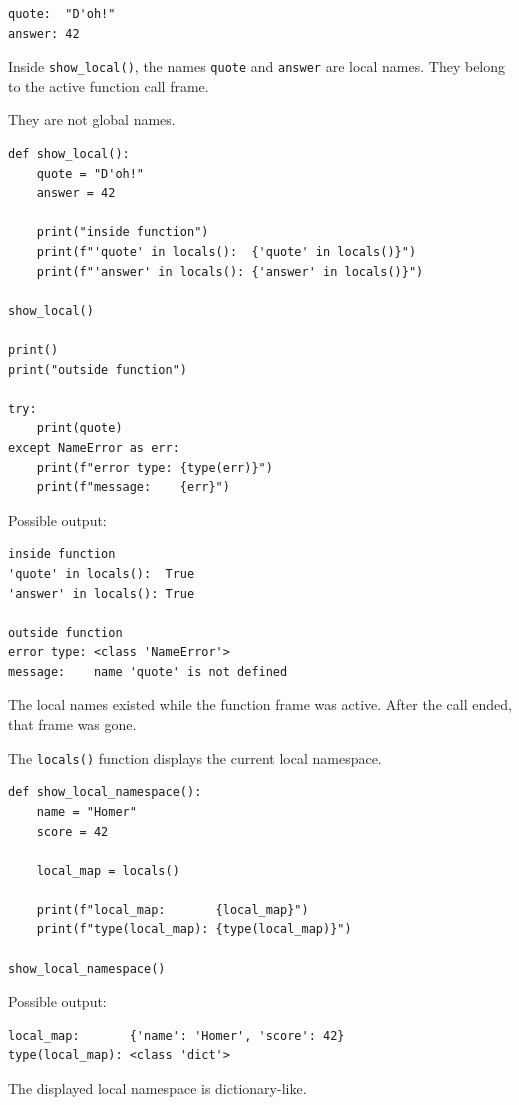 \begin{verbatim}
quote:  "D'oh!"
answer: 42
\end{verbatim}

Inside \texttt{show\_local()}, the names \texttt{quote} and \texttt{answer} are local names. They belong to the active function call frame.

They are not global names.

\begin{verbatim}
def show_local():
    quote = "D'oh!"
    answer = 42

    print("inside function")
    print(f"'quote' in locals():  {'quote' in locals()}")
    print(f"'answer' in locals(): {'answer' in locals()}")

show_local()

print()
print("outside function")

try:
    print(quote)
except NameError as err:
    print(f"error type: {type(err)}")
    print(f"message:    {err}")
\end{verbatim}

Possible output:

\begin{verbatim}
inside function
'quote' in locals():  True
'answer' in locals(): True

outside function
error type: <class 'NameError'>
message:    name 'quote' is not defined
\end{verbatim}

The local names existed while the function frame was active. After the call ended, that frame was gone.

The \texttt{locals()} function displays the current local namespace.

\begin{verbatim}
def show_local_namespace():
    name = "Homer"
    score = 42

    local_map = locals()

    print(f"local_map:       {local_map}")
    print(f"type(local_map): {type(local_map)}")

show_local_namespace()
\end{verbatim}

Possible output:

\begin{verbatim}
local_map:       {'name': 'Homer', 'score': 42}
type(local_map): <class 'dict'>
\end{verbatim}

The displayed local namespace is dictionary-like.

